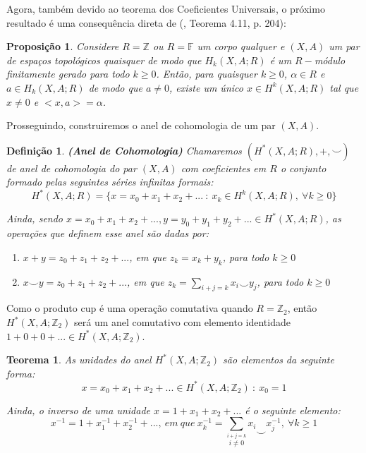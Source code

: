 \documentclass[12pt,oneside]{book} %
\newtheorem{defi}   {\hspace{0.5cm}Defini\c c\~ao}[chapter]
\newtheorem{teo}    {\hspace{0.5cm}Teorema}[chapter]
\newtheorem{prop}   {\hspace{0.5cm}Proposi\c c\~ao}[chapter]
\newcommand{\ds}{\displaystyle}
\newcommand{\Z}{\mathbb{Z}}
\newcommand{\F}{\mathbb{F}}
\newcommand{\ccup}{\smile}
\begin{document}
\par Agora, também devido ao teorema dos Coeficientes Universais, o próximo resultado é uma consequência direta de (\cite{hungerford}, Teorema 4.11, p. 204):

\begin{prop}\label{prop_alg_comut}
	Considere $R=\Z$ ou $R=\F$ um corpo qualquer e $(X,A)$ um par de espaços topológicos quaisquer de modo que $H_{k}(X,A;R)$ é um $R-$módulo finitamente gerado para todo $k\geq 0$. Então, para quaisquer $k\geq 0$, $\alpha\in R$ e $a\in H_{k}(X,A;R)$ de modo que $a\neq 0$, existe um único $x\in H^{k}(X,A;R)$ tal que $x\neq 0$ e $<x,a>=\alpha$.
\end{prop}

\par Prosseguindo, construiremos o anel de cohomologia de um par $(X,A)$.

\begin{defi}{\bf (Anel de Cohomologia)}
	Chamaremos $(H^{*}(X,A;R),+,\ccup)$ de anel de cohomologia do par $(X,A)$ com coeficientes em $R$ o conjunto formado pelas seguintes séries infinitas formais:
	$$H^{*}(X,A;R)=\{ x=x_{0}+x_{1}+x_{2}+... \ : \ x_{k}\in H^{k}(X,A;R), \ \forall k\geq 0 \}$$
	
	Ainda, sendo $x=x_{0}+x_{1}+x_{2}+..., y=y_{0}+y_{1}+y_{2}+...\in H^{*}(X,A;R)$, as operações que definem esse anel são dadas por:
	
	\begin{enumerate}
		\item $x+y=z_{0}+z_{1}+z_{2}+...$, em que $z_{k}=x_{k}+y_{k}$, para todo $k\geq 0$		
		\item $x\ccup y=z_{0}+z_{1}+z_{2}+...$, em que $z_{k}=\ds\sum_{i+j=k}x_{i}\ccup y_{j}$, para todo $k\geq 0$
	\end{enumerate} 
\end{defi} 

\par Como o produto cup é uma operação comutativa quando $R=\Z_{2}$, então $H^{*}(X,A;\Z_{2})$ será um anel comutativo com elemento identidade $1+0+0+...\in H^{*}(X,A;\Z_{2})$.

\begin{teo}\label{teo_elemento_inversivel}
	As unidades do anel $H^{*}(X,A;\Z_{2})$ são elementos da seguinte forma:
	$$ x=x_{0}+x_{1}+x_{2}+...\in H^{*}(X,A;\Z_{2}) \ : \ x_{0}=1 $$
	
	\par Ainda, o inverso de uma unidade $x=1+x_{1}+x_{2}+...$ é o seguinte elemento:
	$$ x^{-1}=1+x^{-1}_{1}+x^{-1}_{2}+..., \ em \ que \ x^{-1}_{k}=\ds\sum_{\stackrel{i+j=k}{i\neq 0}}x_{i}\ccup x^{-1}_{j}, \ \forall k\geq 1 $$
\end{teo}
\end{document}
